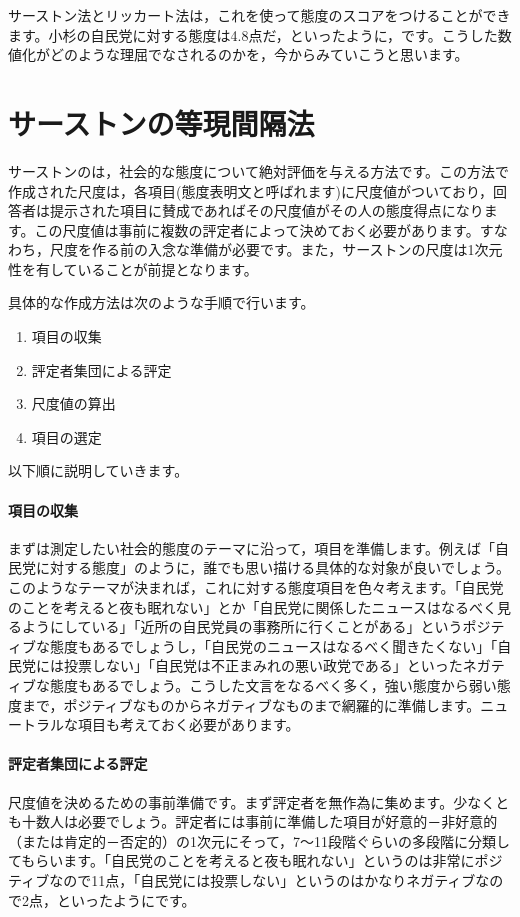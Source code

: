 \documentclass{ltjsbook}
\begin{document}
サーストン法とリッカート法は，これを使って態度のスコアをつけることができます。小杉の自民党に対する態度は4.8点だ，といったように，です。こうした数値化がどのような理屈でなされるのかを，今からみていこうと思います。

\section{サーストンの等現間隔法}
\label{ThurstoneScale}
サーストンのは，社会的な態度について絶対評価を与える方法です。この方法で作成された尺度は，各項目(態度表明文と呼ばれます)に尺度値がついており，回答者は提示された項目に賛成であればその尺度値がその人の態度得点になります。この尺度値は事前に複数の評定者によって決めておく必要があります。すなわち，尺度を作る前の入念な準備が必要です。また，サーストンの尺度は1次元性を有していることが前提となります。

具体的な作成方法は次のような手順で行います。
\begin{enumerate}
    \item 項目の収集
    \item 評定者集団による評定
    \item 尺度値の算出
    \item 項目の選定
\end{enumerate}

以下順に説明していきます。
\paragraph{項目の収集}まずは測定したい社会的態度のテーマに沿って，項目を準備します。例えば「自民党に対する態度」のように，誰でも思い描ける具体的な対象が良いでしょう。このようなテーマが決まれば，これに対する態度項目を色々考えます。「自民党のことを考えると夜も眠れない」とか「自民党に関係したニュースはなるべく見るようにしている」「近所の自民党員の事務所に行くことがある」というポジティブな態度もあるでしょうし，「自民党のニュースはなるべく聞きたくない」「自民党には投票しない」「自民党は不正まみれの悪い政党である」といったネガティブな態度もあるでしょう。こうした文言をなるべく多く，強い態度から弱い態度まで，ポジティブなものからネガティブなものまで網羅的に準備します。ニュートラルな項目も考えておく必要があります。

\paragraph{評定者集団による評定}尺度値を決めるための事前準備です。まず評定者を無作為に集めます。少なくとも十数人は必要でしょう。評定者には事前に準備した項目が好意的－非好意的（または肯定的－否定的）の1次元にそって，7〜11段階ぐらいの多段階に分類してもらいます。「自民党のことを考えると夜も眠れない」というのは非常にポジティブなので11点，「自民党には投票しない」というのはかなりネガティブなので2点，といったようにです。
\end{document}
